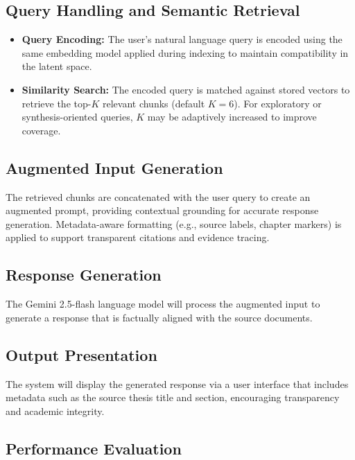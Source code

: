 \begin{refsection}
\subsection*{Query Handling and Semantic Retrieval}

\begin{itemize}
    \item \textbf{Query Encoding:} The user’s natural language query is encoded using the same embedding model applied during indexing to maintain compatibility in the latent space.
    \item \textbf{Similarity Search:} The encoded query is matched against stored vectors to retrieve the top-$K$ relevant chunks (default $K=6$). For exploratory or synthesis-oriented queries, $K$ may be adaptively increased to improve coverage.
\end{itemize}

\subsection*{Augmented Input Generation}

The retrieved chunks are concatenated with the user query to create an augmented prompt, providing contextual grounding for accurate response generation. Metadata-aware formatting (e.g., source labels, chapter markers) is applied to support transparent citations and evidence tracing.

\subsection*{Response Generation}

The Gemini 2.5-flash language model will process the augmented input to generate a response that is factually aligned with the source documents.

\subsection*{Output Presentation}

The system will display the generated response via a user interface that includes metadata such as the source thesis title and section, encouraging transparency and academic integrity.

\subsection*{Performance Evaluation}


\end{refsection}
